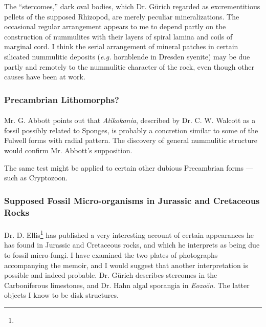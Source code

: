 \documentclass[a4paper, 12pt, oneside]{article}
\begin{document}
The ``stercomes,'' dark oval bodies, which Dr. Gürich regarded as excrementitious pellets of the supposed Rhizopod, are merely peculiar mineralizations. The occasional regular arrangement appears to me to depend partly on the construction of nummulites with their layers of spiral lamina and coils of marginal cord. I think the serial arrangement of mineral patches in certain silicated nummulitic deposits (\emph{e.g.} hornblende in Dresden syenite) may be due partly and remotely to the nummulitic character of the rock, even though other causes have been at work.

\subsubsection{Precambrian Lithomorphs?}
\paragraph{}
Mr. G. Abbott points out that \emph{Atikokania}, described by Dr. C. W. Walcott as a fossil possibly related to Sponges, is probably a concretion similar to some of the Fulwell forms with radial pattern. The discovery of general nummulitic structure would confirm Mr. Abbott's supposition.

The same test might be applied to certain other dubious Precambrian forms --- such as Cryptozoon.

\subsubsection{Supposed Fossil Micro-organisms in Jurassic and Cretaceous Rocks}
\paragraph{}
Dr. D. Ellis\footnote{} has published a very interesting account of certain appearances he has found in Jurassic and Cretaceous rocks, and which he interprets as being due to fossil micro-fungi. I have examined the two plates of photographs accompanying the memoir, and I would suggest that another interpretation is possible and indeed probable. Dr. Gürich describes stercomes in the Carboniferous limestones, and Dr. Hahn algal sporangia in \emph{Eozoön}. The latter objects I know to be disk structures.
\end{document}
